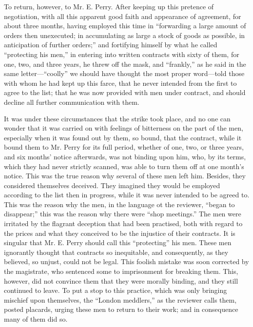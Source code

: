 To return, however, to Mr. E. Perry. After keeping up this pretence of
negotiation, with all this apparent good faith and appearance of
agreement, for about three months, having employed this time in
``forwarding a large amount of orders then unexecuted; in accumulating
as large a stock of goods as possible, in anticipation of further
orders;'' and fortifying himself by what he called ``protecting his
men,'' in entering into written contracts with sixty of them, for one,
two, and three years, he threw off the mask, and ``frankly,'' as he said
in the same letter---``coolly'' we should have thought the most proper
word---told those with whom he had kept up this farce, that he never
intended from the first to agree to the list; that he was now provided
with men under contract, and should decline all further communication
with them.

It was under these circumstances that the strike took place, and no one
can wonder that it was carried on with feelings of bitterness on the
part of the men, especially when it was found out by them, so bound,
that the contract, while it bound them to Mr. Perry for its full period,
whether of one, two, or three years, and six months' notice afterwards,
was not binding upon him, who, by its terms, which they had never
strictly scanned, was able to turn them off at one month's notice. This
was the true reason why several of these men left him. Besides, they
considered themselves deceived. They imagined they would be employed
according to the list then in progress, while it was never intended to
be agreed to. This was the reason why the men, in the language ot the
reviewer, ``began to disappear;'' this was the reason why there were
``shop meetings.'' The men were irritated by the flagrant deception that
had been practised, both with regard to the prices and what they
conceived to be the injustice of their contracts. It is singular that
Mr. E. Perry should call this ``protecting'' his men. These men
ignorantly thought that contracts so inequitable, and consequently, as
they believed, so unjust, could not be legal. This foolish mistake was
soon corrected by the magistrate, who sentenced some to imprisonment for
breaking them. This, however, did not convince them that they were
morally binding, and they still continued to leave. To put a stop to
this practice, which was only bringing mischief upon themselves, the
``London meddlers,'' as the reviewer calls them, posted placards, urging
these men to return to their work; and in consequence many of them did
so.


